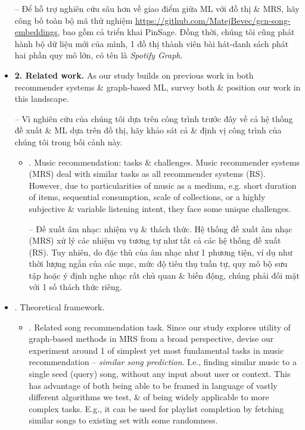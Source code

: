 \documentclass{article}
\begin{document}
\begin{itemize}
    -- Để hỗ trợ nghiên cứu sâu hơn về giao điểm giữa ML với đồ thị \& MRS, hãy công bố toàn bộ mã thử nghiệm \url{https://github.com/MatejBevec/gcn-song-embeddings}, bao gồm cả triển khai PinSage. Đồng thời, chúng tôi cũng phát hành bộ dữ liệu mới của mình, 1 đồ thị thành viên bài hát-danh sách phát hai phần quy mô lớn, có tên là {\it Spotify Graph}.
    \item {\bf2. Related work.} As our study builds on previous work in both recommender systems \& graph-based ML, survey both \& position our work in this landscape.

    -- Vì nghiên cứu của chúng tôi dựa trên công trình trước đây về cả hệ thống đề xuất \& ML dựa trên đồ thị, hãy khảo sát cả \& định vị công trình của chúng tôi trong bối cảnh này.
    \begin{itemize}
        \item {. Music recommendation: tasks \& challenges.} Music recommender systems (MRS) deal with similar tasks as all recommender systems (RS). However, due to particularities of music as a medium, e.g. short duration of items, sequential consumption, scale of collections, or a highly subjective \& variable listening intent, they face some unique challenges.

        -- {\sf Đề xuất âm nhạc: nhiệm vụ \& thách thức.} Hệ thống đề xuất âm nhạc (MRS) xử lý các nhiệm vụ tương tự như tất cả các hệ thống đề xuất (RS). Tuy nhiên, do đặc thù của âm nhạc như 1 phương tiện, ví dụ như thời lượng ngắn của các mục, mức độ tiêu thụ tuần tự, quy mô bộ sưu tập hoặc ý định nghe nhạc rất chủ quan \& biến động, chúng phải đối mặt với 1 số thách thức riêng.
    \end{itemize}
    \item {. Theoretical framework.}
    \begin{itemize}
        \item {. Related song recommendation task.} Since our study explores utility of graph-based methods in MRS from a broad perspective, devise our experiment around 1 of simplest yet most fundamental tasks in music recommendation -- {\it similar song prediction}. I.e., finding similar music to a single seed (query) song, without any input about user or context. This has advantage of both being able to be framed in language of vastly different algorithms we test, \& of being widely applicable to more complex tasks. E.g., it can be used for playlist completion by fetching similar songs to existing set with some randomness.


\end{itemize}
\end{itemize}
\end{document}
